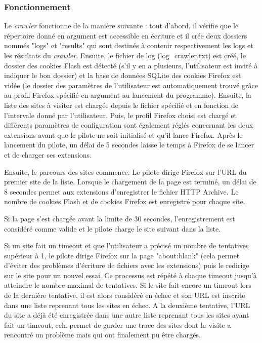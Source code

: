 \subsubsection{Fonctionnement}
Le \textit{crawler} fonctionne de la manière suivante : tout d'abord, il vérifie que le répertoire donné en argument est accessible en écriture et il crée deux dossiers nommés "logs" et "results" qui sont destinés à contenir respectivement les logs et les résultats du \textit{crawler}. Ensuite, le fichier de log (log\_crawler.txt) est créé, le dossier des cookies Flash est détecté (s'il y en a plusieurs, l'utilisateur est invité à indiquer le bon dossier) et la base de données SQLite des cookies Firefox est vidée (le dossier des paramètres de l'utilisateur est automatiquement trouvé grâce au profil Firefox spécifié en argument au lancement du programme). Ensuite, la liste des sites à visiter est chargée depuis le fichier spécifié et en fonction de l'intervale donné par l'utilisateur. Puis, le profil Firefox choisi est chargé et différents paramètres de configuration sont également réglés concernant les deux extensions avant que le pilote ne soit initialisé et qu'il lance Firefox. Après le lancement du pilote, un délai de 5 secondes laisse le temps à Firefox de se lancer et de charger ses extensions.
\newline

Ensuite, le parcours des sites commence. Le pilote dirige Firefox sur l'URL du premier site de la liste. Lorsque le chargement de la page est terminé, un délai de 8 secondes permet aux extensions d'enregistrer le fichier HTTP Archive. Le nombre de cookies Flash et de cookies Firefox est enregistré pour chaque site.

Si la page s'est chargée avant la limite de 30 secondes, l'enregistrement est considéré comme valide et le pilote charge le site suivant dans la liste.

Si un site fait un timeout et que l'utilisateur a précisé un nombre de tentatives supérieur à 1, le pilote dirige Firefox sur la page "about:blank" (cela permet d'éviter des problèmes d'écriture de fichiers avec les extensions) puis le redirige sur le site pour un nouvel essai. Ce processus est répété à chaque timeout jusqu'à atteindre le nombre maximal de tentatives. Si le site fait encore un timeout lors de la dernière tentative, il est alors considéré en échec et son URL est inscrite dans une liste reprenant tous les sites en échec. A la deuxième tentative, l'URL du site a déjà été enregistrée dans une autre liste reprenant tous les sites ayant fait un timeout, cela permet de garder une trace des sites dont la visite a rencontré un problème mais qui ont finalement pu être chargés. 

